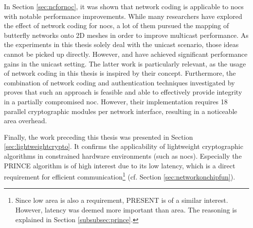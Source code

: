 In Section \ref{sec:ncfornoc}, it was shown that network coding is applicable to \glspl{noc} with notable performance improvements. While many
researchers have explored the effect of network coding for \glspl{noc}, a lot of them pursued the mapping of butterfly networks onto 2D meshes in
order to improve multicast performance. As the experiments in this thesis solely deal with the unicast scenario, those ideas cannot be picked up
directly. However, \citeauthor{duongba11ncinmulticore} \cite{duongba11ncinmulticore} and \citeauthor{moriam15manycorenc} \cite{moriam15manycorenc}
have achieved significant performance gains in the unicast setting. The latter work is particularly relevant, as the usage of network coding in this
thesis is inspired by their concept. Furthermore, the combination of network coding and authentication techniques investigated by
\citeauthor{moriam18activeattackers} \cite{moriam18activeattackers} proves that such an approach is feasible and able to effectively provide integrity
in a partially compromised \gls{noc}. However, their implementation requires 18 parallel cryptographic modules per network interface, resulting in a
noticeable area overhead.
\pagebreak

Finally, the work preceding this thesis was presented in Section \ref{sec:lightweightcrypto}. It confirms the applicability of lightweight
cryptographic algorithms in constrained hardware environments (such as \glspl{noc}). Especially the PRINCE algorithm is of high interest due to its
low latency, which is a direct requirement for efficient communication\footnote{Since low area is also a requirement, PRESENT is of a similar
interest. However, latency was deemed more important than area. The reasoning is explained in Section \ref{subsubsec:prince}.} (cf. Section
\ref{sec:networkonchipfun}).
